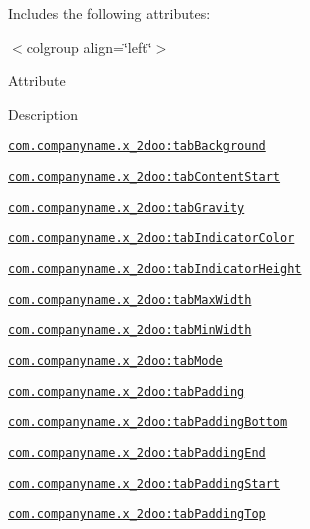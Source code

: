 Includes the following attributes: \begin{TabularC}{0}
\hline
\end{TabularC}
$<$colgroup align=\char`\"{}left\char`\"{}$>$ 

Attribute

Description 

{\tt \hyperlink{classandroid_1_1support_1_1v4_1_1_r_1_1styleable_675e2f29080457fa431fc68be4479b4f}{com.companyname.x\_\-2doo:tabBackground}}

{\tt \hyperlink{classandroid_1_1support_1_1v4_1_1_r_1_1styleable_df711e29dcdb60bbd96c539283d0f4f1}{com.companyname.x\_\-2doo:tabContentStart}}

{\tt \hyperlink{classandroid_1_1support_1_1v4_1_1_r_1_1styleable_972b042e4a3fcafa9cafaf6453a759e2}{com.companyname.x\_\-2doo:tabGravity}}

{\tt \hyperlink{classandroid_1_1support_1_1v4_1_1_r_1_1styleable_ecd068c380384ff47f22004dc6bf860e}{com.companyname.x\_\-2doo:tabIndicatorColor}}

{\tt \hyperlink{classandroid_1_1support_1_1v4_1_1_r_1_1styleable_be8e5fea2ebe1b6d9d9aa4cca6549e78}{com.companyname.x\_\-2doo:tabIndicatorHeight}}

{\tt \hyperlink{classandroid_1_1support_1_1v4_1_1_r_1_1styleable_8e0718dd07664eb909dcf60018ef5c49}{com.companyname.x\_\-2doo:tabMaxWidth}}

{\tt \hyperlink{classandroid_1_1support_1_1v4_1_1_r_1_1styleable_4b4566378cac3b5013ed493236349b6d}{com.companyname.x\_\-2doo:tabMinWidth}}

{\tt \hyperlink{classandroid_1_1support_1_1v4_1_1_r_1_1styleable_87f917746f24bf8503296b15435b51c7}{com.companyname.x\_\-2doo:tabMode}}

{\tt \hyperlink{classandroid_1_1support_1_1v4_1_1_r_1_1styleable_4298aad07907a00ae8fb09582886b5c7}{com.companyname.x\_\-2doo:tabPadding}}

{\tt \hyperlink{classandroid_1_1support_1_1v4_1_1_r_1_1styleable_52f17fc2c908e7fc2d72f48472b4125e}{com.companyname.x\_\-2doo:tabPaddingBottom}}

{\tt \hyperlink{classandroid_1_1support_1_1v4_1_1_r_1_1styleable_ed971a95ce0c06adb144c8d88ab0fe8f}{com.companyname.x\_\-2doo:tabPaddingEnd}}

{\tt \hyperlink{classandroid_1_1support_1_1v4_1_1_r_1_1styleable_1a5292e1b40f0fa300a0dbb3286373d6}{com.companyname.x\_\-2doo:tabPaddingStart}}

{\tt \hyperlink{classandroid_1_1support_1_1v4_1_1_r_1_1styleable_1bbc5410da0ccdca7252583408dbbb6a}{com.companyname.x\_\-2doo:tabPaddingTop}}

